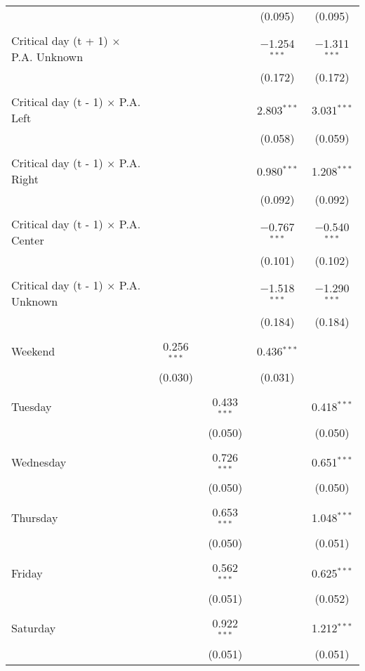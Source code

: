 \documentclass[
]{article}
\begin{document}
\begin{table}[!htbp]
{\begin{tabular}{@{\extracolsep{5pt}}lcccc}
  &  &  & (0.095) & (0.095) \\ 
  & & & & \\ 
 Critical day (t + 1) $\times$ P.A. Unknown &  &  & $-$1.254$^{***}$ & $-$1.311$^{***}$ \\ 
  &  &  & (0.172) & (0.172) \\ 
  & & & & \\ 
 Critical day (t - 1) $\times$ P.A. Left &  &  & 2.803$^{***}$ & 3.031$^{***}$ \\ 
  &  &  & (0.058) & (0.059) \\ 
  & & & & \\ 
 Critical day (t - 1) $\times$ P.A. Right &  &  & 0.980$^{***}$ & 1.208$^{***}$ \\ 
  &  &  & (0.092) & (0.092) \\ 
  & & & & \\ 
 Critical day (t - 1) $\times$ P.A. Center &  &  & $-$0.767$^{***}$ & $-$0.540$^{***}$ \\ 
  &  &  & (0.101) & (0.102) \\ 
  & & & & \\ 
 Critical day (t - 1) $\times$ P.A. Unknown &  &  & $-$1.518$^{***}$ & $-$1.290$^{***}$ \\ 
  &  &  & (0.184) & (0.184) \\ 
  & & & & \\ 
 Weekend & 0.256$^{***}$ &  & 0.436$^{***}$ &  \\ 
  & (0.030) &  & (0.031) &  \\ 
  & & & & \\ 
 Tuesday &  & 0.433$^{***}$ &  & 0.418$^{***}$ \\ 
  &  & (0.050) &  & (0.050) \\ 
  & & & & \\ 
 Wednesday &  & 0.726$^{***}$ &  & 0.651$^{***}$ \\ 
  &  & (0.050) &  & (0.050) \\ 
  & & & & \\ 
 Thursday &  & 0.653$^{***}$ &  & 1.048$^{***}$ \\ 
  &  & (0.050) &  & (0.051) \\ 
  & & & & \\ 
 Friday &  & 0.562$^{***}$ &  & 0.625$^{***}$ \\ 
  &  & (0.051) &  & (0.052) \\ 
  & & & & \\ 
 Saturday &  & 0.922$^{***}$ &  & 1.212$^{***}$ \\ 
  &  & (0.051) &  & (0.051) \\ 

\end{tabular}}
\end{table}
\end{document}
